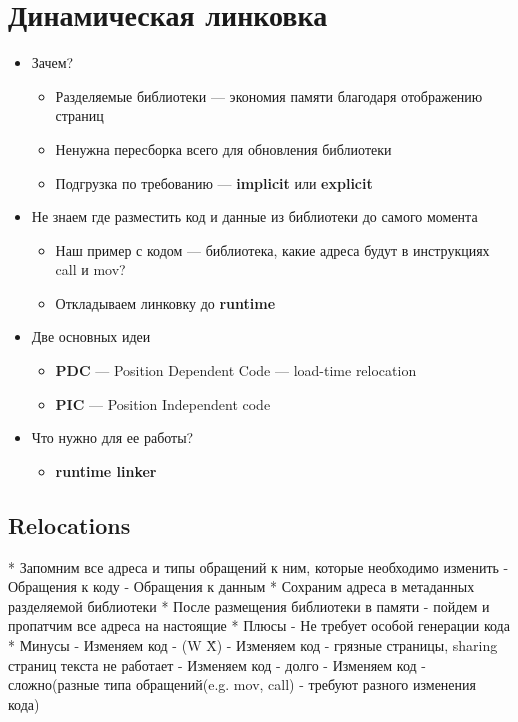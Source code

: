 \documentclass[../../lectures.tex]{subfiles}
\begin{document}
\section{Динамическая линковка}
\begin{itemize}
    \item Зачем?
        \begin{itemize}
            \item Разделяемые библиотеки --- экономия памяти благодаря отображению страниц
            \item Ненужна пересборка всего для обновления библиотеки
            \item Подгрузка по требованию --- \textbf{implicit} или \textbf{explicit}
        \end{itemize}
    \item Не знаем где разместить код и данные из библиотеки до самого момента
        \begin{itemize}
            \item Наш пример с кодом --- библиотека, какие адреса будут в инструкциях call и mov?
            \item Откладываем линковку до \textbf{runtime}
        \end{itemize}
    \item Две основных идеи
        \begin{itemize}
            \item \textbf{PDC} --- Position Dependent Code --- load-time relocation
            \item \textbf{PIC} --- Position Independent code
        \end{itemize}
    \item Что нужно для ее работы?
        \begin{itemize}
            \item \textbf{runtime linker}
        \end{itemize}
\end{itemize}

\subsection{Relocations}
  * Запомним все адреса и типы обращений к ним, которые необходимо изменить
    - Обращения к коду
    - Обращения к данным
  * Сохраним адреса в метаданных разделяемой библиотеки
  * После размещения библиотеки в памяти - пойдем и пропатчим все адреса на настоящие
  * Плюсы
    - Не требует особой генерации кода
  * Минусы
    - Изменяем код - (W \^ X)
    - Изменяем код - грязные страницы, sharing страниц текста не работает
    - Изменяем код - долго
    - Изменяем код - сложно(разные типа обращений(e.g. mov, call) - требуют разного изменения кода)
\end{document}
